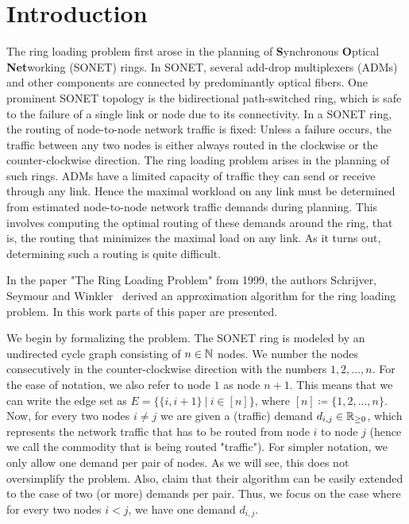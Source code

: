 \section{Introduction}

The ring loading problem first arose in the planning of \textbf{S}ynchronous \textbf{O}ptical \textbf{Net}working (SONET) rings.
In SONET, several add-drop multiplexers (ADMs) and other components are connected by predominantly optical fibers.
One prominent SONET topology is the bidirectional path-switched ring, which is safe to the failure of a single link or node due to its connectivity.
In a SONET ring, the routing of node-to-node network traffic is fixed: Unless a failure occurs, the traffic between any two nodes is either always routed in the clockwise or the counter-clockwise direction.
The ring loading problem arises in the planning of such rings.
ADMs have a limited capacity of traffic they can send or receive through any link.
Hence the maximal workload on any link must be determined from estimated node-to-node network traffic demands during planning.
This involves computing the optimal routing of these demands around the ring, that is, the routing that minimizes the maximal load on any link.
As it turns out, determining such a routing is quite difficult.

In the paper "The Ring Loading Problem" from 1999, the authors Schrijver, Seymour and Winkler~\cite{schrijver99} derived an approximation algorithm for the ring loading problem.
In this work parts of this paper are presented.

We begin by formalizing the problem.
The SONET ring is modeled by an undirected cycle graph consisting of $n \in \mathbb{N}$ nodes.
We number the nodes consecutively in the counter-clockwise direction with the numbers $1, 2, \dots, n$.
For the ease of notation, we also refer to node $1$ as node $n+1$.
This means that we can write the edge set as $E = \{\{i, i+1\}\ |\ i \in [n]\}$, where $[n] \coloneqq \{1, 2, \ldots, n\}$.
Now, for every two nodes $i \neq j$ we are given a (traffic) demand $d_{i, j} \in \mathbb{R}_{\geq 0}$, which represents the network traffic that has to be routed from node $i$ to node $j$ (hence we call the commodity that is being routed "traffic").
For simpler notation, we only allow one demand per pair of nodes.
As we will see, this does not oversimplify the problem.
Also, \citet{schrijver99} claim that their algorithm can be easily extended to the case of two (or more) demands per pair.
Thus, we focus on the case where for every two nodes $i < j$, we have one demand $d_{i,j}$.

